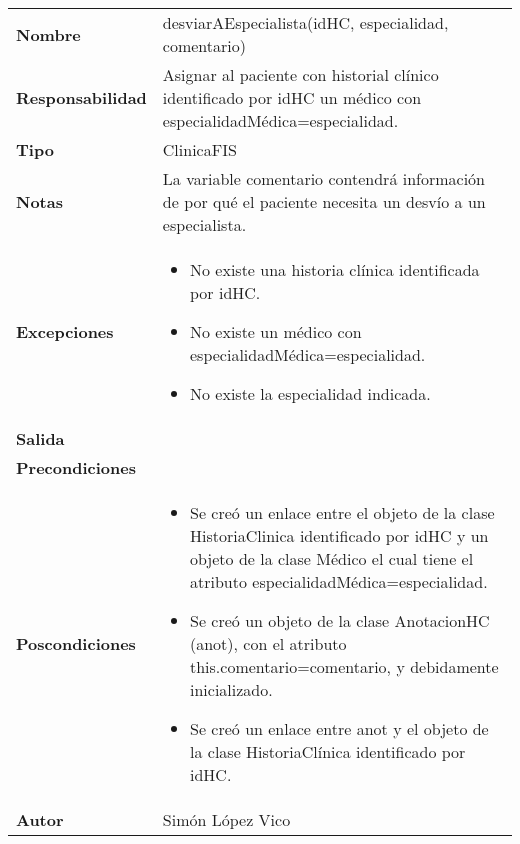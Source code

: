 \documentclass[11pt,a4paper]{article}
\newenvironment{itemizenomargins}
    {\begin{minipage}[t]{1\linewidth}\begin{itemize}}
    {\end{itemize}\end{minipage}}
\begin{document}
\begin{table}[H]
	\centering
	\label{my-label}
	\begin{tabularx}{\textwidth}{l|X}
		\textbf{Nombre}          & desviarAEspecialista(idHC, especialidad, comentario)\\
		\textbf{Responsabilidad} & Asignar al paciente con historial clínico identificado por idHC un médico con especialidadMédica=especialidad.\\
		\textbf{Tipo}            & ClinicaFIS \\
		\textbf{Notas}           & La variable comentario contendrá información de por qué el paciente necesita un desvío a un especialista. \\
		\textbf{Excepciones}     &
		\begin{itemizenomargins}
			\item No existe una historia clínica identificada por idHC.
			\item No existe un médico con especialidadMédica=especialidad.
			\item No existe la especialidad indicada.
		\end{itemizenomargins} \\
		\textbf{Salida}          &  \\
		\textbf{Precondiciones}  &  \\
		\textbf{Poscondiciones}  &
		\begin{itemizenomargins}
			\item Se creó un enlace entre el objeto de la clase HistoriaClinica identificado por idHC y un objeto de la clase Médico el cual tiene el atributo especialidadMédica=especialidad.
			\item Se creó un objeto de la clase AnotacionHC (anot), con el atributo this.comentario=comentario, y debidamente inicializado.
			\item Se creó un enlace entre anot y el objeto de la clase HistoriaClínica identificado por idHC.
		\end{itemizenomargins} \\
		\textbf{Autor}			 & Simón López Vico
	\end{tabularx}
\end{table}
\end{document}
